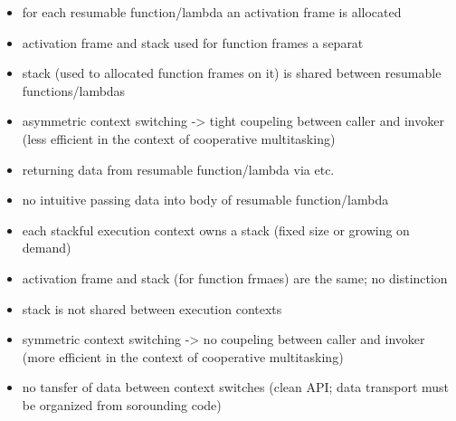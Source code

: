 \begin{itemize}
    \item   for each resumable function/lambda an activation frame is allocated
    \item   activation frame and stack used for function frames a separat
    \item   stack (used to allocated function frames on it) is shared between
            resumable functions/lambdas
    \item   asymmetric context switching -> tight coupeling between caller and
            invoker (less efficient in the context of cooperative multitasking)
    \item   returning data from resumable function/lambda via \yield etc.
    \item   no intuitive passing data into body of resumable function/lambda
\end{itemize}

\begin{itemize}
    \item   each stackful execution context owns a stack (fixed size or growing
            on demand)
    \item   activation frame and stack (for function frmaes) are the same; no
            distinction
    \item   stack is not shared between execution contexts
    \item   symmetric context switching -> no coupeling between caller and
            invoker (more efficient in the context of cooperative multitasking)
    \item   no tansfer of data between context switches (clean API; data transport
            must be organized from sorounding code)
\end{itemize}
